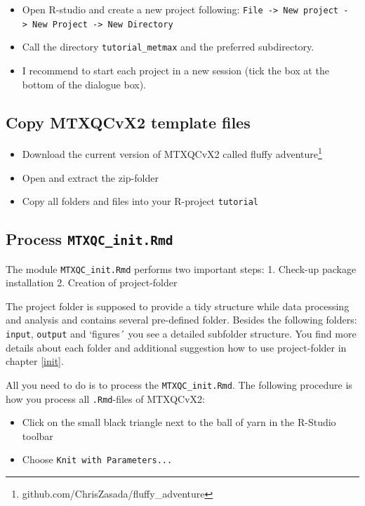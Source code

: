 \documentclass[]{book}
\providecommand{\tightlist}{%
  \setlength{\itemsep}{0pt}\setlength{\parskip}{0pt}}
\let\rmarkdownfootnote\footnote%
\def\footnote{\protect\rmarkdownfootnote}
\theoremstyle{definition}
\theoremstyle{definition}
\theoremstyle{definition}
\theoremstyle{remark}
\begin{document}
\begin{itemize}
\tightlist
\item
  Open R-studio and create a new project following:
  \texttt{File\ -\textgreater{}\ New\ project\ -\textgreater{}\ New\ Project\ -\textgreater{}\ New\ Directory}
\item
  Call the directory \texttt{tutorial\_metmax} and the preferred
  subdirectory.
\item
  I recommend to start each project in a new session (tick the box at
  the bottom of the dialogue box).
\end{itemize}

\subsection{Copy MTXQCvX2 template
files}\label{copy-mtxqcvx2-template-files-1}

\begin{itemize}
\tightlist
\item
  Download the current version of MTXQCvX2 called fluffy
  adventure\footnote{github.com/ChrisZasada/fluffy\_adventure}
\item
  Open and extract the zip-folder
\item
  Copy all folders and files into your R-project \texttt{tutorial}
\end{itemize}

\subsection{\texorpdfstring{Process
\texttt{MTXQC\_init.Rmd}}{Process MTXQC\_init.Rmd}}\label{process-mtxqc_init.rmd-1}

The module \texttt{MTXQC\_init.Rmd} performs two important steps: 1.
Check-up package installation 2. Creation of project-folder

The project folder is supposed to provide a tidy structure while data
processing and analysis and contains several pre-defined folder. Besides
the following folders: \texttt{input}, \texttt{output} and `figures´ you
see a detailed subfolder structure. You find more details about each
folder and additional suggestion how to use project-folder in chapter
\ref{init}.

All you need to do is to process the \texttt{MTXQC\_init.Rmd}. The
following procedure is how you process all \texttt{.Rmd}-files of
MTXQCvX2:

\begin{itemize}
\tightlist
\item
  Click on the small black triangle next to the ball of yarn in the
  R-Studio toolbar
\item
  Choose \texttt{Knit\ with\ Parameters...}
\end{itemize}
\end{document}
